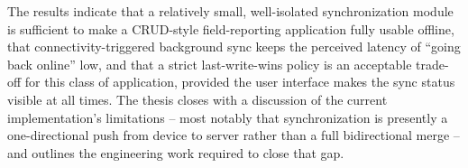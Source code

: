 The results indicate that a relatively small, well-isolated synchronization
module is sufficient to make a CRUD-style field-reporting application fully
usable offline, that connectivity-triggered background sync keeps the
perceived latency of ``going back online'' low, and that a strict
last-write-wins policy is an acceptable trade-off for this class of
application, provided the user interface makes the sync status visible at
all times. The thesis closes with a discussion of the current
implementation's limitations -- most notably that synchronization is
presently a one-directional push from device to server rather than a full
bidirectional merge -- and outlines the engineering work required to close
that gap.
